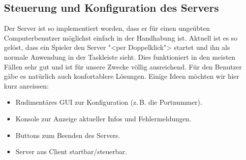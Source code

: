 \documentclass[12pt,halfparskip]{scrartcl}
\begin{document}
\subsection{Steuerung und Konfiguration des Servers}
Der Server ist so implementiert worden, dass er für einen ungeübten Computerbenutzer möglichst einfach in der Handhabung ist. Aktuell ist es so gelöst, dass ein Spieler den Server "<per Doppelklick"> startet und ihn als normale Anwendung in der Taskleiste sieht. Dies funktioniert in den meisten Fällen sehr gut und ist für unsere Zwecke völlig ausreichend. Für den Benutzer gäbe es natürlich auch konfortablere Lösungen. Einige Ideen möchten wir hier kurz anreissen:
\begin{itemize}
	\item Rudimentäres GUI zur Konfiguration (z.\,B. die Portnummer).
	\item Konsole zur Anzeige aktueller Infos und Fehlermeldungen.
	\item Buttons zum Beenden des Servers.
	\item Server aus Client startbar/steuerbar.
\end{itemize}
\end{document}
